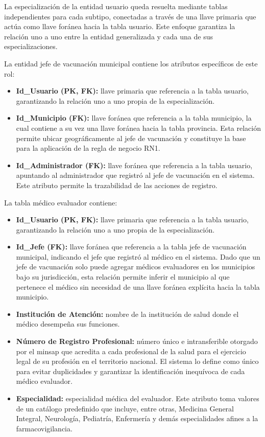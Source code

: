 La especialización de la entidad usuario queda resuelta mediante tablas independientes para cada subtipo, conectadas a través de una llave primaria que actúa como llave foránea hacia la tabla usuario.
Este enfoque garantiza la relación uno a uno entre la entidad generalizada y cada una de sus especializaciones.

La entidad jefe de vacunación municipal contiene los atributos específicos de este rol:

\begin{itemize}
    \item \textbf{Id\_Usuario (PK, FK):} llave primaria que referencia a la tabla usuario, garantizando la relación uno a uno propia de la especialización.
    \item \textbf{Id\_Municipio (FK):} llave foránea que referencia a la tabla municipio, la cual contiene a su vez una llave foránea hacia la tabla provincia. Esta relación permite ubicar geográficamente al jefe de vacunación y constituye la base para la aplicación de la regla de negocio RN1.
    \item \textbf{Id\_Administrador (FK):} llave foránea que referencia a la tabla usuario, apuntando al administrador que registró al jefe de vacunación en el sistema. Este atributo permite la trazabilidad de las acciones de registro.
\end{itemize}

La tabla médico evaluador contiene:

\begin{itemize}
    \item \textbf{Id\_Usuario (PK, FK):} llave primaria que referencia a la tabla usuario, garantizando la relación uno a uno propia de la especialización.
    \item \textbf{Id\_Jefe (FK):} llave foránea que referencia a la tabla jefe de vacunación municipal, indicando el jefe que registró al médico en el sistema. Dado que un jefe de vacunación solo puede agregar médicos evaluadores en los municipios bajo su jurisdicción, esta relación permite inferir el municipio al que pertenece el médico sin necesidad de una llave foránea explícita hacia la tabla municipio.
    \item \textbf{Institución de Atención:} nombre de la institución de salud donde el médico desempeña sus funciones.
    \item \textbf{Número de Registro Profesional:} número único e intransferible otorgado por el \gls{minsap} que acredita a cada profesional de la salud para el ejercicio legal de su profesión en el territorio nacional. El sistema lo define como único para evitar duplicidades y garantizar la identificación inequívoca de cada médico evaluador.
    \item \textbf{Especialidad:} especialidad médica del evaluador. Este atributo toma valores de un catálogo predefinido que incluye, entre otras, Medicina General Integral, Neurología, Pediatría, Enfermería y demás especialidades afines a la farmacovigilancia.
\end{itemize}


